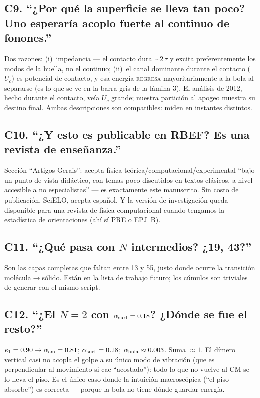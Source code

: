 \documentclass[11pt,a4paper]{article}
\begin{document}
\subsection*{C9. ``¿Por qué la superficie se lleva tan poco? Uno
esperaría acoplo fuerte al continuo de fonones.''}
\begin{respuesta}
Dos razones: (i)~impedancia --- el contacto dura $\sim2\,\tau$ y excita
preferentemente los modos de la huella, no el continuo; (ii)~el canal
dominante durante el contacto ($U_c$) es potencial de contacto, y esa
energía \textsc{regresa} mayoritariamente a la bola al separarse (es lo
que se ve en la barra gris de la lámina 3). El análisis de 2012, hecho
durante el contacto, veía $U_c$ grande; nuestra partición al apogeo
muestra su destino final. Ambas descripciones son compatibles: miden en
instantes distintos.
\end{respuesta}

\subsection*{C10. ``¿Y esto es publicable en RBEF? Es una revista de
enseñanza.''}
\begin{respuesta}
Sección ``Artigos Gerais'': acepta física
teórica/computacional/experimental ``bajo un punto de vista didáctico,
con temas poco discutidos en textos clásicos, a nivel accesible a no
especialistas'' --- es exactamente este manuscrito. Sin costo de
publicación, SciELO, acepta español. Y la versión de investigación queda
disponible para una revista de física computacional cuando tengamos la
estadística de orientaciones (ahí sí PRE o EPJ~B).
\end{respuesta}

\subsection*{C11. ``¿Qué pasa con $N$ intermedios? ¿19, 43?''}
\begin{respuesta}
Son las capas completas que faltan entre 13 y 55, justo donde ocurre la
transición molécula$\to$sólido. Están en la lista de trabajo futuro; los
cúmulos son triviales de generar con el mismo script.
\end{respuesta}

\subsection*{C12. ``¿El $N=2$ con $\alpha_{\rm surf}=0.18$? ¿Dónde se fue
el resto?''}
\begin{respuesta}
$e_1=0.90\to\alpha_{\rm cm}=0.81$; $\alpha_{\rm surf}=0.18$;
$\alpha_{\rm bola}\approx0.003$. Suma $\approx1$. El dímero vertical casi
no acopla el golpe a su único modo de vibración (que es perpendicular al
movimiento si cae ``acostado''): todo lo que no vuelve al CM se lo lleva
el piso. Es el único caso donde la intuición macroscópica (``el piso
absorbe'') es correcta --- porque la bola no tiene dónde guardar energía.
\end{respuesta}
\end{document}
